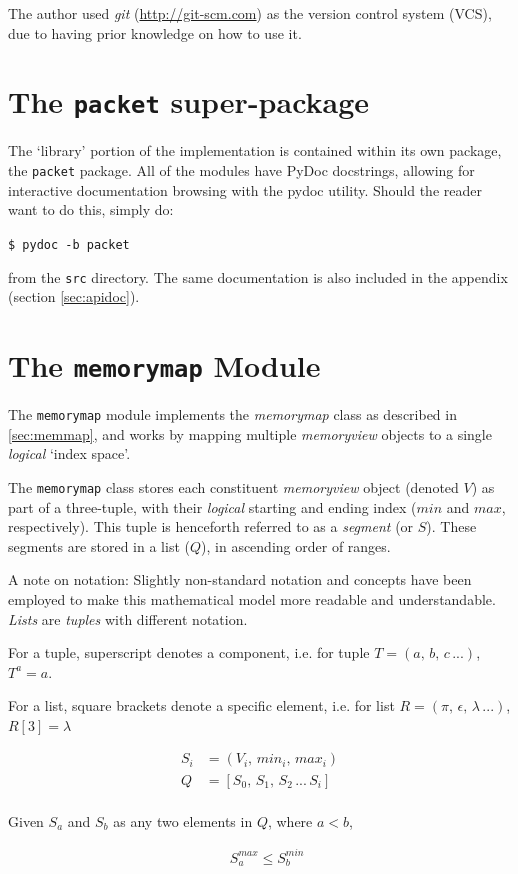 \documentclass[10pt,a4paper,notitlepage]{report}
\begin{document}
The author used \emph{git} (\url{http://git-scm.com}) as the version control system (VCS), due to having prior knowledge on how to use it.

\section{The \texttt{packet} super-package}
The `library' portion of the implementation is contained within its own package, the \texttt{packet} package. All of the modules have PyDoc docstrings, allowing for interactive documentation browsing with the pydoc utility. Should the reader want to do this, simply do:

\texttt{\$ pydoc -b packet}

from the \texttt{src} directory. The same documentation is also included in the appendix (section \ref{sec:apidoc}).

\section{The \texttt{memorymap} Module}
The \texttt{memorymap} module implements the \emph{memorymap} class as described in \ref{sec:memmap}, and works by mapping multiple \emph{memoryview} objects to a single \emph{logical} `index space'.

The \texttt{memorymap} class stores each constituent \emph{memoryview} object (denoted $V$) as part of a three-tuple,  with their \emph{logical} starting and ending index ($min$ and $max$, respectively). This tuple is henceforth referred to as a \emph{segment} (or $S$). These segments are stored in a list ($Q$), in ascending order of ranges.

{\small
A note on notation: Slightly non-standard notation and concepts have been employed to make this mathematical model more readable and understandable. \emph{Lists} are \emph{tuples} with different notation.

For a tuple, superscript denotes a component, i.e.  for tuple $T = (a,\, b,\, c\, ...)$,   $T^{a} = a$.

For a list, square brackets denote a specific element, i.e. for list $R = (\pi,\, \epsilon,\, \lambda\, ...)$, $R[3] = \lambda$
}

\begin{align*}
S_{i} &= ( V_{i},\, min_{i},\, max_{i} )\\
Q &= [ S_{0},\, S_{1},\, S_{2}\, ... \,S_{i} ]\\
\end{align*}
\begin{center}
Given $S_{a}$ and $S_{b}$ as any two elements in $Q$, where $a < b$,
\end{center}
\begin{align*}
&\ S_{a}^{max} \leq S_{b}^{min} 
\end{align*}
\end{document}
